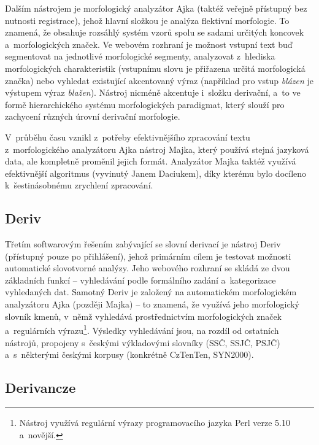 Dalším nástrojem je morfologický analyzátor Ajka (taktéž veřejně
přístupný bez nutnosti registrace), jehož hlavní složkou je analýza
flektivní morfologie. To znamená, že obsahuje rozsáhlý systém vzorů
spolu se sadami určitých koncovek a~morfologických značek. Ve webovém
rozhraní je možnost vstupní text buď segmentovat na jednotlivé
morfologické segmenty, analyzovat z~hlediska morfologických
charakteristik (vstupnímu slovu je přiřazena určitá morfologická značka)
nebo vyhledat existující akcentovaný výraz (například pro vstup
\emph{blázen} je výstupem výraz \emph{blažen}). Nástroj nicméně
akcentuje i~složku derivační, a~to ve formě hierarchického systému
morfologických paradigmat, který slouží pro zachycení různých úrovní
derivační morfologie.~\parencite{ajka}

V~průběhu času vznikl z~potřeby efektivnějšího zpracování textu
z~morfologického analyzátoru Ajka nástroj Majka, který používá stejná
jazyková data, ale kompletně proměnil jejich formát. Analyzátor Majka
taktéž využívá efektivnější algoritmus (vyvinutý Janem Daciukem), díky
kterému bylo docíleno k~šestinásobnému zrychlení zpracování.
\parencite{majka}

\hypertarget{deriv}{%
\subsection{Deriv}\label{deriv}}

Třetím softwarovým řešením zabývající se slovní derivací je nástroj
Deriv (přístupný pouze po přihlášení), jehož primárním cílem je testovat
možnosti automatické slovotvorné analýzy. Jeho webového rozhraní se
skládá ze dvou základních funkcí -- vyhledávání podle formálního zadání
a~kategorizace vyhledaných dat. Samotný Deriv je založený na
automatickém morfologickém analyzátoru Ajka (později Majka) -- to
znamená, že využívá jeho morfologický slovník kmenů, v~němž vyhledává
prostřednictvím morfologických značek a~regulárních
výrazu\footnote{Nástroj využívá regulární výrazy programovacího jazyka Perl verze 5.10 a~novější.}.
Výsledky vyhledávání jsou, na rozdíl od ostatních nástrojů, propojeny
s~českými výkladovými slovníky (SSČ, SSJČ, PSJČ) a~s~některými českými
korpusy (konkrétně CzTenTen, SYN2000).~\parencite{deriv}

\hypertarget{derivancze}{%
\subsection{Derivancze}\label{derivancze}}

